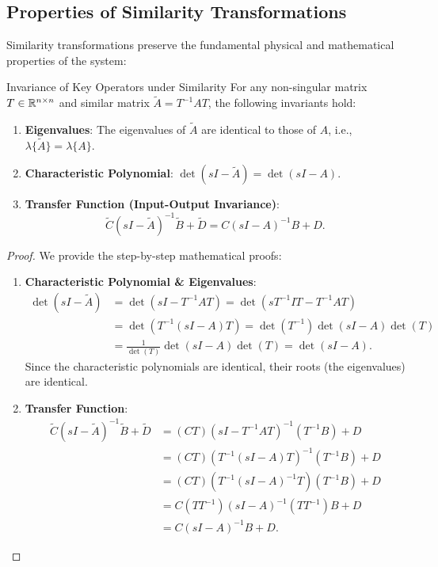 \subsection{Properties of Similarity Transformations}
Similarity transformations preserve the fundamental physical and mathematical properties of the system:
\begin{mytheorem}{Invariance of Key Operators under Similarity}
For any non-singular matrix $T \in \mathbb{R}^{n \times n}$ and similar matrix $\tilde{A} = T^{-1} A T$, the following invariants hold:
\begin{enumerate}
    \item \textbf{Eigenvalues}: The eigenvalues of $\tilde{A}$ are identical to those of $A$, i.e., $\lambda\{\tilde{A}\} = \lambda\{A\}$.
    \item \textbf{Characteristic Polynomial}: $\det(sI - \tilde{A}) = \det(sI - A)$.
    \item \textbf{Transfer Function (Input-Output Invariance)}:
    \begin{equation}
\tilde{C}(sI - \tilde{A})^{-1}\tilde{B} + \tilde{D} = C(sI - A)^{-1}B + D .
    \end{equation}
\end{enumerate}
\end{mytheorem}

\begin{proof}
We provide the step-by-step mathematical proofs:
\begin{enumerate}
    \item \textbf{Characteristic Polynomial \& Eigenvalues}:
    \begin{align}
        \det(sI - \tilde{A}) &= \det(sI - T^{-1}AT) = \det(sT^{-1}IT - T^{-1}AT) \nonumber \\
        &= \det(T^{-1}(sI - A)T) = \det(T^{-1}) \det(sI - A) \det(T) \nonumber \\
&= \frac{1}{\det(T)} \det(sI - A) \det(T) = \det(sI - A) .
    \end{align}
    Since the characteristic polynomials are identical, their roots (the eigenvalues) are identical.
    \item \textbf{Transfer Function}:
    \begin{align}
        \tilde{C}(sI - \tilde{A})^{-1}\tilde{B} + \tilde{D} &= (CT)(sI - T^{-1}AT)^{-1}(T^{-1}B) + D \nonumber \\
        &= (CT)(T^{-1}(sI - A)T)^{-1}(T^{-1}B) + D \nonumber \\
        &= (CT)(T^{-1}(sI - A)^{-1}T)(T^{-1}B) + D \nonumber \\
        &= C (T T^{-1}) (sI - A)^{-1} (T T^{-1}) B + D \nonumber \\
&= C (sI - A)^{-1} B + D .
    \end{align}
\end{enumerate}
\end{proof}

